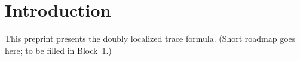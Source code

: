 \section{Introduction}\label{sec:intro}
This preprint presents the doubly localized trace formula. 
(Short roadmap goes here; to be filled in Block~1.)

